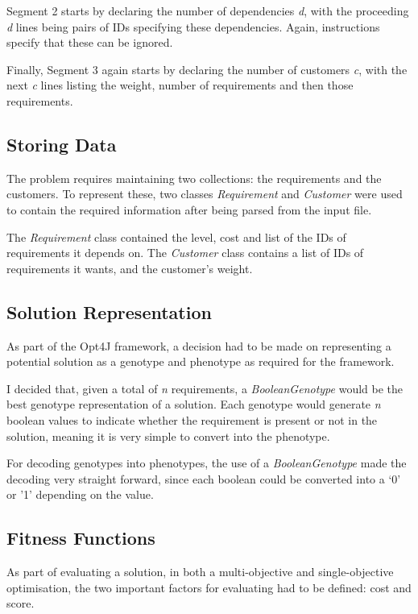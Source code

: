 \documentclass[10pt, a4paper]{article}
\begin{document}
Segment 2 starts by declaring the number of dependencies \emph{d}, with the
proceeding \emph{d} lines being pairs of IDs specifying these dependencies.
Again, instructions specify that these can be ignored.

Finally, Segment 3 again starts by declaring the number of customers \emph{c},
with the next \emph{c} lines listing the weight, number of requirements and then
those requirements.

\subsection{Storing Data} %
\label{sub:storing_data}
The problem requires maintaining two collections: the requirements and the
customers. To represent these, two classes \emph{Requirement} and
\emph{Customer} were used to contain the required information after being parsed
from the input file.

The \emph{Requirement} class contained the level, cost and list of the IDs of
requirements it depends on. The \emph{Customer} class contains a list of IDs of
requirements it wants, and the customer's weight.

\subsection{Solution Representation} %
\label{sub:Solution_representation}
As part of the Opt4J framework, a decision had to be made on representing a
potential solution as a genotype and phenotype as required for the framework.

I decided that, given a total of \emph{n} requirements, a \emph{BooleanGenotype}
would be the best genotype representation of a solution. Each genotype would
generate \emph{n} boolean values to indicate whether the requirement is present
or not in the solution, meaning it is very simple to convert into the phenotype.

For decoding genotypes into phenotypes, the use of a \emph{BooleanGenotype} made
the decoding very straight forward, since each boolean could be converted into a
`0' or '1' depending on the value.

\subsection{Fitness Functions} %
\label{sub:fitness_functions}
As part of evaluating a solution, in both a multi-objective and single-objective
optimisation, the two important factors for evaluating had to be defined: cost
and score.
\end{document}
